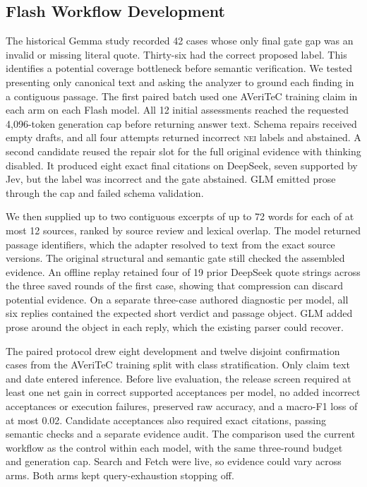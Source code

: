 \documentclass[conference]{IEEEtran}
\newcommand{\NEI}{\textsc{nei}}
\begin{document}
\subsection{Flash Workflow Development}
\label{sec:flash-development}
The historical Gemma study recorded 42 cases whose only final gate gap was an invalid or missing literal quote. Thirty-six had the correct proposed label. This identifies a potential coverage bottleneck before semantic verification. We tested presenting only canonical text and asking the analyzer to ground each finding in a contiguous passage. The first paired batch used one AVeriTeC training claim in each arm on each Flash model. All 12 initial assessments reached the requested 4,096-token generation cap before returning answer text. Schema repairs received empty drafts, and all four attempts returned incorrect \NEI{} labels and abstained. A second candidate reused the repair slot for the full original evidence with thinking disabled. It produced eight exact final citations on DeepSeek, seven supported by Jev, but the label was incorrect and the gate abstained. GLM emitted prose through the cap and failed schema validation.

We then supplied up to two contiguous excerpts of up to 72 words for each of at most 12 sources, ranked by source review and lexical overlap. The model returned passage identifiers, which the adapter resolved to text from the exact source versions. The original structural and semantic gate still checked the assembled evidence. An offline replay retained four of 19 prior DeepSeek quote strings across the three saved rounds of the first case, showing that compression can discard potential evidence. On a separate three-case authored diagnostic per model, all six replies contained the expected short verdict and passage object. GLM added prose around the object in each reply, which the existing parser could recover.

The paired protocol drew eight development and twelve disjoint confirmation cases from the AVeriTeC training split with class stratification. Only claim text and date entered inference. Before live evaluation, the release screen required at least one net gain in correct supported acceptances per model, no added incorrect acceptances or execution failures, preserved raw accuracy, and a macro-F1 loss of at most 0.02. Candidate acceptances also required exact citations, passing semantic checks and a separate evidence audit. The comparison used the current workflow as the control within each model, with the same three-round budget and generation cap. Search and Fetch were live, so evidence could vary across arms. Both arms kept query-exhaustion stopping off.
\end{document}
